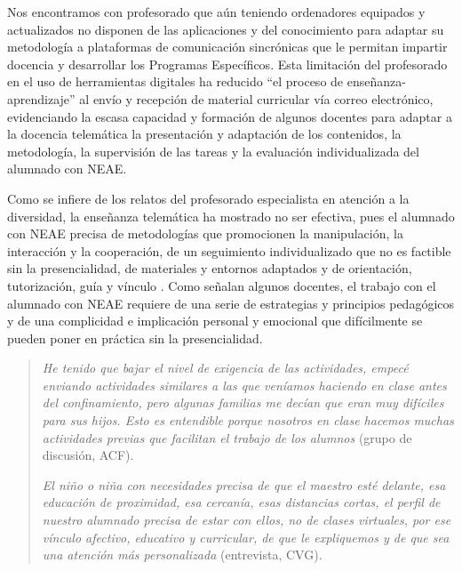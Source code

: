 \documentclass[spanish]{textolivre}
\begin{document}
Nos encontramos con profesorado que aún teniendo ordenadores equipados y actualizados no disponen de las aplicaciones y del conocimiento para adaptar su metodología a plataformas de comunicación sincrónicas que le permitan impartir docencia y desarrollar los Programas Específicos. Esta limitación del profesorado en el uso de herramientas digitales ha reducido “el proceso de enseñanza-aprendizaje” al envío y recepción de material curricular vía correo electrónico, evidenciando la escasa capacidad y formación de algunos docentes para adaptar a la docencia telemática la presentación y adaptación de los contenidos, la metodología, la supervisión de las tareas y la evaluación individualizada del alumnado con NEAE.

Como se infiere de los relatos del profesorado especialista en atención a la diversidad, la enseñanza telemática ha mostrado no ser efectiva, pues el alumnado con NEAE precisa de metodologías que promocionen la manipulación, la interacción y la cooperación, de un seguimiento individualizado que no es factible sin la presencialidad, de materiales y entornos adaptados \cite{rogero2020} %
y de orientación, tutorización, guía y vínculo \cite{munoz2020}. %
Como señalan algunos docentes, el trabajo con el alumnado con NEAE requiere de una serie de estrategias y principios pedagógicos y de una complicidad e implicación personal y emocional que difícilmente se pueden poner en práctica sin la presencialidad.

\begin{quote}
\emph{He tenido que bajar el nivel de exigencia de las actividades, empecé enviando actividades similares a las que veníamos haciendo en clase antes del confinamiento, pero algunas familias me decían que eran muy difíciles para sus hijos. Esto es entendible porque nosotros en clase hacemos muchas actividades previas que facilitan el trabajo de los alumnos} (grupo de discusión, ACF).

\emph{El niño o niña con necesidades precisa de que el maestro esté delante, esa educación de proximidad, esa cercanía, esas distancias cortas, el perfil de nuestro alumnado precisa de estar con ellos, no de clases virtuales, por ese vínculo afectivo, educativo y curricular, de que le expliquemos y de que sea una atención más personalizada} (entrevista, CVG).
\end{quote}
\end{document}
